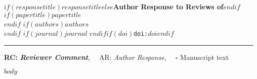 \documentclass{article}
\begin{document}
{\Large\bf $if(responsetitle)$$responsetitle$$else$Author Response to Reviews of$endif$}\\[1em]
$if(papertitle)${\huge $papertitle$}\\[1em]$endif$
$if(authors)${$authors$}\\$endif$
$if(journal)${\it $journal$ }$endif$$if(doi)$\texttt{doi:$doi$}$endif$\\
\hrule

\hfill {\bfseries RC:} \textbf{\textit{Reviewer Comment}},\(\quad\) AR: \emph{Author Response}, \(\quad\square\) Manuscript text

$body$
\end{document}
